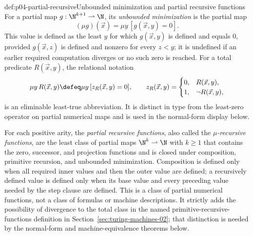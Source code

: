 \begin{hbdefinition}{def:p04-partial-recursive}{Unbounded minimization and partial recursive functions}
For a partial map \(g:\N^{k+1}\rightharpoonup\N\), its \emph{unbounded
minimization} is the partial map
\[
  (\mu g)(\vec x)=\mu y\,[g(\vec x,y)=0].
\]
This value is defined as the least \(y\) for which \(g(\vec x,y)\) is defined
and equals \(0\), provided \(g(\vec x,z)\) is defined and nonzero for every
\(z<y\); it is undefined if an earlier required computation diverges or no
such zero is reached.  For a total predicate \(R(\vec x,y)\), the relational
notation
\[
 \mu y\,R(\vec x,y)
 \defeq \mu y\,[z_R(\vec x,y)=0],
 \qquad
 z_R(\vec x,y)=
 \begin{cases}0,&R(\vec x,y),\\1,&\neg R(\vec x,y),\end{cases}
\]
is an eliminable least-true abbreviation.  It is distinct in type from the
least-zero operator on partial numerical maps and is used in the normal-form
display below.

For each positive arity, the \emph{partial recursive functions}, also called the
\emph{\(\mu\)-recursive functions}, are the least class of
partial maps \(\N^k\rightharpoonup\N\) with \(k\geq1\) that contains the zero,
successor, and projection functions and is closed under composition, primitive
recursion, and unbounded minimization.  Composition is defined only when all
required inner values and then the outer value are defined; a recursively
defined value is defined only when its base value and every preceding value
needed by the step clause are defined.  This is a class of partial numerical
functions, not a class of formulas or machine descriptions.  It strictly adds
the possibility of divergence to the total class in
the named primitive-recursive-functions definition in
Section~\ref{sec:turing-machines-02}; that distinction is
needed by the normal-form and machine-equivalence theorems below.
\end{hbdefinition}

